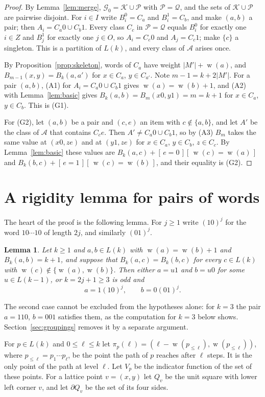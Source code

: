 \documentclass[11pt]{amsart}
\newtheorem{lemma}[theorem]{Lemma}
\theoremstyle{definition}
\theoremstyle{remark}
\numberwithin{equation}{section}
\newcommand{\cA}{\mathcal{A}}
\newcommand{\cG}{\mathcal{G}}
\newcommand{\cK}{\mathcal{K}}
\newcommand{\cP}{\mathcal{P}}
\newcommand{\cQ}{\mathcal{Q}}
\newcommand{\Iv}[1]{[\,#1\,]}
\DeclareMathOperator{\wt}{w}
\begin{document}
\begin{proof}
By Lemma~\ref{lem:merge}, $\cG_0=\cK\cup\cP$ with $\cP=\cQ$, and the sets of $\cK\cup\cP$ are pairwise disjoint. For $i\in I$ write $B_i^0=C_a$ and $B_i^1=C_b$, and make $(a,b)$ a pair; then $A_i=C_a0\cup C_b1$. Every class $C_c$ in $\cP=\cQ$ equals $B_i^0$ for exactly one $i\in Z$ and $B_j^1$ for exactly one $j\in O$, so $A_i=C_c0$ and $A_j=C_c1$; make $\{c\}$ a singleton. This is a partition of $L(k)$, and every class of $\cA$ arises once.

By Proposition~\ref{prop:skeleton}, words of $C_a$ have weight $|M'|+\wt(a)$, and $B_{m-1}(x,y)=B_k(a,a')$ for $x\in C_a$, $y\in C_{a'}$. Note $m-1=k+2|M'|$. For a pair $(a,b)$, (A1) for $A_i=C_a0\cup C_b1$ gives $\wt(a)=\wt(b)+1$, and (A2) with Lemma~\ref{lem:basic} gives $B_k(a,b)=B_m(x0,y1)=m=k+1$ for $x\in C_a$, $y\in C_b$. This is (G1).

For (G2), let $(a,b)$ be a pair and $(c,e)$ an item with $c\notin\{a,b\}$, and let $A'$ be the class of $\cA$ that contains $C_ce$. Then $A'\ne C_a0\cup C_b1$, so by (A3) $B_m$ takes the same value at $(x0,z e)$ and at $(y1,ze)$ for $x\in C_a$, $y\in C_b$, $z\in C_c$. By Lemma~\ref{lem:basic} these values are $B_k(a,c)+\Iv{e=0}\Iv{\wt(c)=\wt(a)}$ and $B_k(b,c)+\Iv{e=1}\Iv{\wt(c)=\wt(b)}$, and their equality is (G2).
\end{proof}

\section{A rigidity lemma for pairs of words}\label{sec:star}

The heart of the proof is the following lemma. For $j\ge1$ write $(10)^j$ for the word $10\cdots10$ of length $2j$, and similarly $(01)^j$.

\begin{lemma}\label{lem:star}
Let $k\ge1$ and $a,b\in L(k)$ with $\wt(a)=\wt(b)+1$ and $B_k(a,b)=k+1$, and suppose that $B_k(a,c)=B_k(b,c)$ for every $c\in L(k)$ with $\wt(c)\notin\{\wt(a),\wt(b)\}$. Then either $a=u1$ and $b=u0$ for some $u\in L(k-1)$, or $k=2j+1\ge3$ is odd and
\[
a=1(10)^j,\qquad b=0(01)^j .
\]
\end{lemma}

The second case cannot be excluded from the hypotheses alone: for $k=3$ the pair $a=110$, $b=001$ satisfies them, as the computation for $k=3$ below shows. Section~\ref{sec:groupings} removes it by a separate argument.

For $p\in L(k)$ and $0\le\ell\le k$ let $\pi_p(\ell)=(\ell-\wt(p_{\le\ell}),\wt(p_{\le\ell}))$, where $p_{\le\ell}=p_1\cdots p_\ell$, be the point the path of $p$ reaches after $\ell$ steps. It is the only point of the path at level $\ell$. Let $V_p$ be the indicator function of the set of these points. For a lattice point $v=(x,y)$ let $Q_v$ be the unit square with lower left corner $v$, and let $\partial Q_v$ be the set of its four sides.
\end{document}
